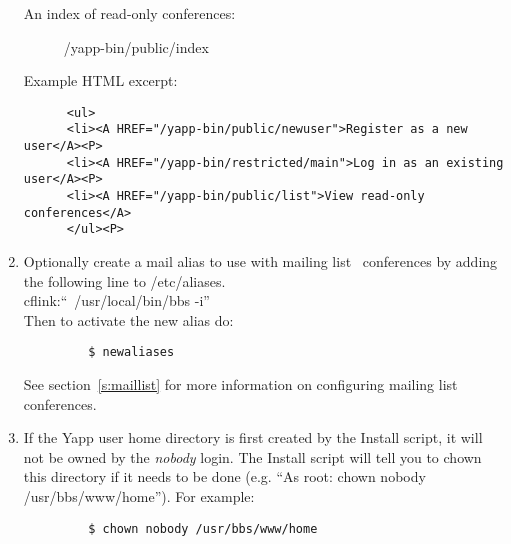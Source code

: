 \documentclass[twoside]{report}
\begin{document}
\begin{enumerate}
\begin{description}
         \item [An index of read-only conferences:]
             /yapp-bin/public/index
         \end{description}

         Example HTML excerpt:
         \begin{verbatim}
      <ul>
      <li><A HREF="/yapp-bin/public/newuser">Register as a new user</A><P>
      <li><A HREF="/yapp-bin/restricted/main">Log in as an existing user</A><P>
      <li><A HREF="/yapp-bin/public/list">View read-only conferences</A>
      </ul><P>
         \end{verbatim}


   \item Optionally create a mail alias to use with mailing 
         list~ conferences by adding the following 
         line to /etc/aliases.\\

         cflink:``\vline \ /usr/local/bin/bbs -i'' \\

         Then to activate the new alias do:
         \begin{verbatim}
         $ newaliases
         \end{verbatim}
         \vspace{-12pt}

         See section~\ref{s:maillist} for more information on configuring 
         mailing list conferences.

   \item If the Yapp user home directory is first created by the Install
         script, it will not be owned by the {\em nobody} 
         login.  The Install script will tell you to chown this directory 
         if it needs to be done (e.g. ``As root: chown nobody 
         /usr/bbs/www/home'').  For example:
         \begin{verbatim}
         $ chown nobody /usr/bbs/www/home
         \end{verbatim}
         \vspace{-12pt}


\end{enumerate}
\end{document}
